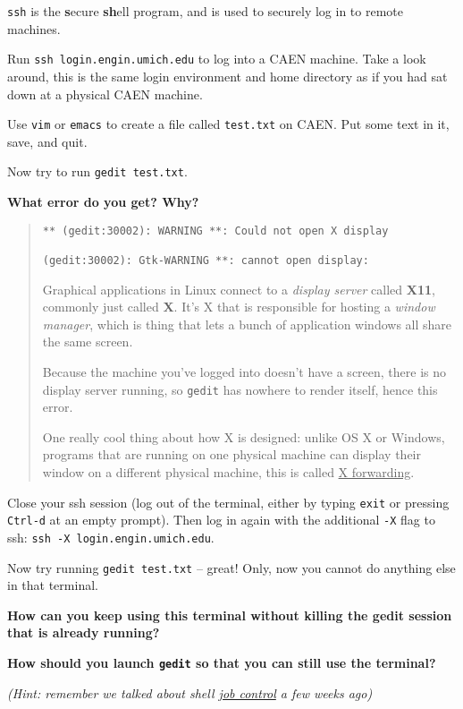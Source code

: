 \documentclass{article}
\begin{document}
\texttt{ssh} is the \textbf{s}ecure \textbf{sh}ell program, and is used to
securely log in to remote machines.

Run \texttt{ssh login.engin.umich.edu} to log into a CAEN machine. Take a look
around, this is the same login environment and home directory as if you had
sat down at a physical CAEN machine.

Use \texttt{vim} or \texttt{emacs} to create a file called \texttt{test.txt}
on CAEN. Put some text in it, save, and quit.

Now try to run \texttt{gedit~test.txt}.

\textbf{What error do you get? Why?}
\begin{quote}
  \color{violet}
  \begin{lstlisting}
** (gedit:30002): WARNING **: Could not open X display

(gedit:30002): Gtk-WARNING **: cannot open display:
  \end{lstlisting}
  Graphical applications in Linux connect to a \emph{display server} called
  \textbf{X11}, commonly just called \textbf{X}. It's X that is responsible
  for hosting a \emph{window manager}, which is thing that lets a bunch of
  application windows all share the same screen.

  Because the machine you've logged into doesn't have a screen, there is no
  display server running, so \texttt{gedit} has nowhere to render itself,
  hence this error.

  One really cool thing about how X is designed: unlike OS X or Windows,
  programs that are running on one physical machine can display their window
  on a different physical machine, this is called \ul{X forwarding}.
\end{quote}

Close your ssh session (log out of the terminal, either by typing
\texttt{exit} or pressing \texttt{Ctrl-d} at an empty prompt). Then log in
again with the additional \texttt{-X} flag to ssh:
\texttt{ssh~-X~login.engin.umich.edu}.

Now try running \texttt{gedit test.txt} -- great! Only, now you cannot do
anything else in that terminal.

\textbf{How can you keep using this terminal without killing the gedit session
  that is already running?}

\textbf{How should you launch \texttt{gedit} so that you can still use the
  terminal?}

\emph{\small (Hint: remember we talked about shell \ul{job control} a few
  weeks ago)}
\end{document}
